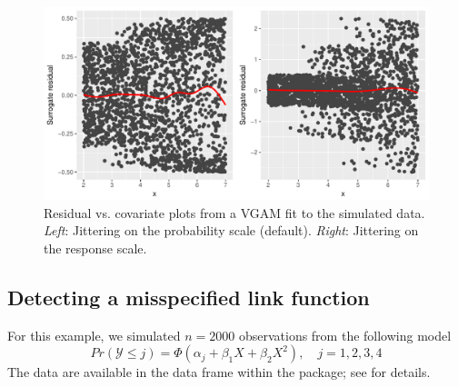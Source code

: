 \begin{figure}[!htbp]
  \centering
  \includegraphics[width=1\textwidth]{heteroscedasticity2}
  \caption{Residual vs. covariate plots from a VGAM fit to the simulated data. \textit{Left}: Jittering on the probability scale (default). \textit{Right}: Jittering on the response scale.}
  \label{fig:heteroscedasticity2}
\end{figure}


\subsection{Detecting a misspecified link function}

For this example, we simulated $n = 2000$ observations from the following model
\begin{equation*}
  Pr\left(\mathcal{Y} \le j\right) = \Phi\left(\alpha_j + \beta_1 X + \beta_2 X ^ 2\right), \quad j = 1, 2, 3, 4
\end{equation*}
The data are available in the data frame  within the package; see  for details.

